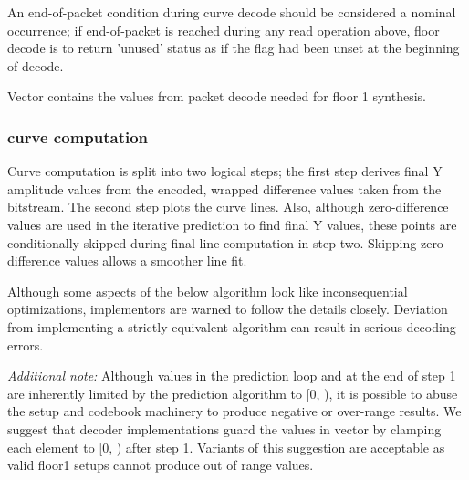 An end-of-packet condition during curve decode should be considered a
nominal occurrence; if end-of-packet is reached during any read
operation above, floor decode is to return 'unused' status as if the
\varname{[nonzero]} flag had been unset at the beginning of decode.


Vector \varname{[floor1\_Y]} contains the values from packet decode
needed for floor 1 synthesis.



\subsubsection{curve computation} \label{vorbis:spec:floor1-synth}

Curve computation is split into two logical steps; the first step
derives final Y amplitude values from the encoded, wrapped difference
values taken from the bitstream.  The second step plots the curve
lines.  Also, although zero-difference values are used in the
iterative prediction to find final Y values, these points are
conditionally skipped during final line computation in step two.
Skipping zero-difference values allows a smoother line fit.

Although some aspects of the below algorithm look like inconsequential
optimizations, implementors are warned to follow the details closely.
Deviation from implementing a strictly equivalent algorithm can result
in serious decoding errors.

{\em Additional note:} Although  values in
the prediction loop and at the end of step 1 are inherently limited by
the prediction algorithm to [0, \varname{[range]}), it is possible to
  abuse the setup and codebook machinery to produce negative or
  over-range results.  We suggest that decoder implementations guard
  the values in vector  by clamping each
  element to [0, \varname{[range]}) after step 1.  Variants of this
    suggestion are acceptable as valid floor1 setups cannot produce
    out of range values.

